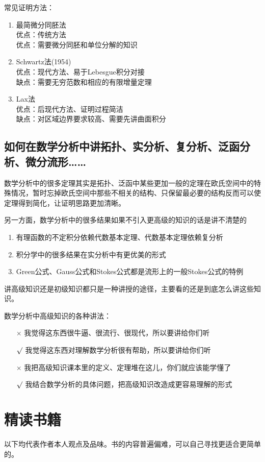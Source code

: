 \documentclass[UTF8]{article}
\begin{document}
    常见证明方法：\begin{enumerate}
        \item 最简微分同胚法\\ 优点：传统方法\\ 优点：需要微分同胚和单位分解的知识
        \item Schwartz法(1954)\\ 优点：现代方法、易于Lebesgue积分对接\\ 缺点：需要无穷范数和相应的有限增量定理
        \item Lax法\\ 优点：后现代方法、证明过程简洁\\ 缺点：对区域边界要求较高、需要先讲曲面积分
    \end{enumerate}
    \subsection{如何在数学分析中讲拓扑、实分析、复分析、泛函分析、微分流形\dots\dots}
    数学分析中的很多定理其实是拓扑、泛函中某些更加一般的定理在欧氏空间中的特殊情况，暂时忘掉欧氏空间中那些不相关的结构、只保留最必要的结构反而可以使定理得到简化，让证明思路更加清晰。

    另一方面，数学分析中的很多结果如果不引入更高级的知识的话是讲不清楚的\begin{enumerate}
        \item 有理函数的不定积分依赖代数基本定理、代数基本定理依赖复分析
        \item 积分学中的很多结果在实分析中有更优美的形式
        \item Green公式、Gauss公式和Stokes公式都是流形上的一般Stokes公式的特例
    \end{enumerate}
    讲高级知识还是初级知识都只是一种讲授的途径，主要看的还是到底怎么讲这些知识。

    数学分析中高级知识的各种讲法：\begin{itemize}
        \item[$\times$] 我觉得这东西很牛逼、很流行、很现代，所以要讲给你们听
        \item[$\surd$] 我觉得这东西对理解数学分析很有帮助，所以要讲给你们听
        \item[$\times$] 我把高级知识课本里的定义、定理堆在这儿，你们就应该能学懂了
        \item[$\surd$] 我结合数学分析的具体问题，把高级知识改造成更容易理解的形式
    \end{itemize}
    \section{精读书籍}
    以下均代表作者本人观点及品味。书的内容普遍偏难，可以自己寻找更适合更简单的。
\end{document}
